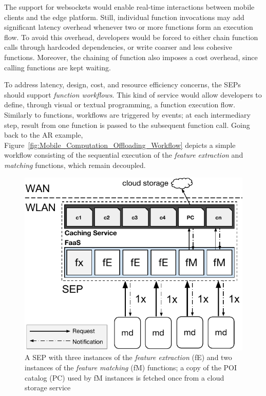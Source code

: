 The support for websockets would enable real-time interactions between mobile clients and the edge platform. Still, individual function invocations may add significant latency overhead whenever two or more functions form an execution flow. To avoid this overhead, developers would be forced to either chain function calls through hardcoded dependencies, or write coarser and less cohesive functions. Moreover, the chaining of function also imposes a cost overhead, since calling functions are kept waiting.%

To address latency, design, cost, and resource efficiency concerns, the SEPs should support \textit{function workflows}. This kind of service would allow developers to define, through visual or textual programming, a function execution flow.
Similarly to functions, workflows are triggered by events; at each intermediary step, result from one function is passed to the subsequent function call. Going back to the AR example, Figure~\ref{fig:Mobile_Computation_Offloading_Workflow} depicts a simple workflow consisting of the sequential execution of the \textit{feature extraction} and \textit{matching} functions, which remain decoupled.%

\begin{figure}[tbp]
	\centering
	\includegraphics[width=\linewidth]{Figs/Mobile_Computation_Offloading_Caching.pdf}
	\caption{A SEP with three instances of the \textit{feature extraction} (fE) and two instances of the \textit{feature matching} (fM) functions; a copy of the POI catalog (PC) used by fM instances is fetched once from a cloud storage service} 
	\label{fig:Mobile_Computation_Offloading_Caching}
\end{figure}

